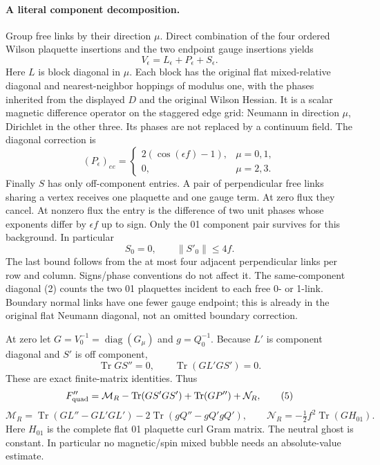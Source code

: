 \documentclass[11pt]{article}
\begin{document}
\paragraph{A literal component decomposition.}
Group free links by their direction $\mu$. Direct combination of the
four ordered Wilson plaquette insertions and the two endpoint gauge
insertions yields
\[
 V_\epsilon=L_\epsilon+P_\epsilon+S_\epsilon.                 \tag{1}
\]
Here $L$ is block diagonal in $\mu$. Each block has the original flat
mixed-relative diagonal and nearest-neighbor hoppings of modulus one,
with the phases inherited from the displayed $D$ and the original Wilson
Hessian. It is a scalar magnetic difference operator on the staggered
edge grid: Neumann in direction $\mu$, Dirichlet in the other three.
Its phases are not replaced by a continuum field. The diagonal correction is
\[
 (P_\epsilon)_{ee}=
 \begin{cases}2(\cos(\epsilon f)-1),&\mu=0,1,\\0,&\mu=2,3.\end{cases}   \tag{2}
\]
Finally $S$ has only off-component entries. A pair of perpendicular
free links sharing a vertex receives one plaquette and one gauge term.
At zero flux they cancel. At nonzero flux the entry is the difference of
two unit phases whose exponents differ by $\epsilon f$ up to sign.
Only the 01 component pair survives for this background. In particular
\[
 S_0=0,\qquad \|S'_0\|\le 4f.                                    \tag{3}
\]
The last bound follows from the at most four adjacent perpendicular
links per row and column. Signs/phase conventions do not affect it.
The same-component diagonal (2) counts the two 01 plaquettes incident
to each free 0- or 1-link. Boundary normal links have one fewer gauge
endpoint; this is already in the original flat Neumann diagonal, not
an omitted boundary correction.

At zero let $G=V_0^{-1}=\operatorname{diag}(G_\mu)$ and $g=Q_0^{-1}$.
Because $L'$ is component diagonal and $S'$ is off component,
\[
 \operatorname{Tr}G S''=0,\qquad
 \operatorname{Tr}(GL'GS')=0.                                    \tag{4}
\]
These are exact finite-matrix identities. Thus
\[
 F_{\rm quad}''=\mathcal M_R-\operatorname{Tr}(GS'GS')
                  +\operatorname{Tr}(GP'')+\mathcal N_R,           \tag{5}
\]
\[
 \mathcal M_R=
 \operatorname{Tr}(GL''-GL'GL')
 -2\operatorname{Tr}(gQ''-gQ'gQ'),\qquad
 \mathcal N_R=-\tfrac12 f^2\operatorname{Tr}(G H_{01}).
\]
Here $H_{01}$ is the complete flat 01 plaquette curl Gram matrix.
The neutral ghost is constant. In particular no magnetic/spin mixed
bubble needs an absolute-value estimate.
\end{document}
